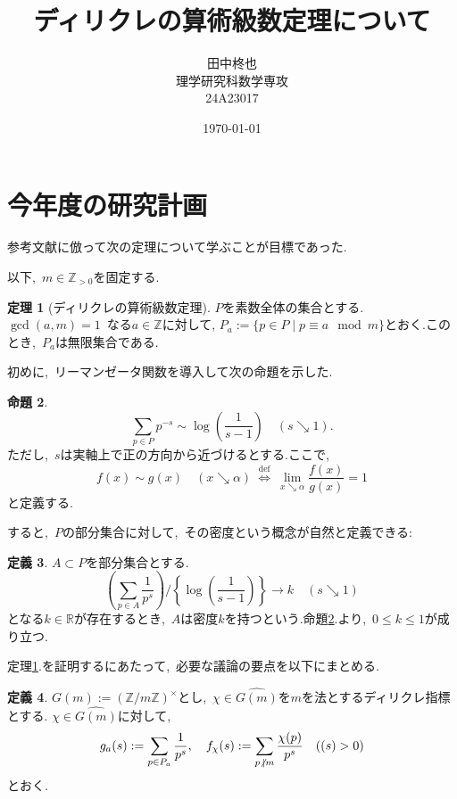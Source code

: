 \documentclass[uplatex,12pt]{jsarticle}
\title{ディリクレの算術級数定理について}
\author{田中柊也\\理学研究科数学専攻\\24A23017}
\date{\today}
\numberwithin{equation}{section}
\theoremstyle{definition}
\newtheorem{definition}{定義}[section]
\newtheorem{theorem}[definition]{定理}
\newtheorem{proposition}[definition]{命題}
\newcommand{\ndiv}{\not\hspace{2pt}\mid}
\let\Re\relax
\DeclareMathOperator{\Re}{Re}
\begin{document}
\section{今年度の研究計画}
参考文献\cite{arithmetic}に倣って次の定理について学ぶことが目標であった.

以下,\ $m\in\mathbb{Z}_{>0}$を固定する.


\begin{theorem}[ディリクレの算術級数定理] \label{thm:Dirichlet}
$P$を素数全体の集合とする.
$\gcd (a,m)=1$\ なる$a\in\mathbb{Z}$に対して, $P_a := \{p\in P \mid p\equiv a\mod m\}$とおく.このとき,\ $P_a$は無限集合である.
\end{theorem}

初めに,\ リーマンゼータ関数を導入して次の命題を示した.

\begin{proposition} \label{thm:zeta}
\begin{equation} 
	\sum_{p\in P}p^{-s}\sim \log\left(\frac{1}{s-1}\right) \quad (s\searrow 1).
\end{equation}
ただし,\ $s$は実軸上で正の方向から近づけるとする.ここで,
\begin{equation}
	f(x)\sim g(x)\quad(x\searrow\alpha)\ \overset{\text{def}}{\Longleftrightarrow}\ \lim_{x\searrow\alpha}\frac{f(x)}{g(x)}=1
\end{equation}
と定義する.
\end{proposition}


すると,\ $P$の部分集合に対して,\ その密度という概念が自然と定義できる:
\begin{definition}
$A\subset P$を部分集合とする.
\begin{equation}
	\left(\sum_{p\in A}\frac{1}{p^s}\right) \bigg/ \left\{\log\left(\frac{1}{s-1}\right)\right\}\rightarrow k \quad(s\searrow 1)
\end{equation}
となる$k\in\mathbb{R}$が存在するとき,\ $A$は密度$k$を持つという.命題\ref{thm:zeta}.より,\ $0\leq k\leq1$が成り立つ.
\end{definition}


定理\ref{thm:Dirichlet}.を証明するにあたって,\ 必要な議論の要点を以下にまとめる.


\begin{definition}
$G(m):=(\mathbb{Z}/m\mathbb{Z})^\times$とし,\ $\chi\in\widehat{G(m)}$を$m$を法とするディリクレ指標とする.
$\chi\in\widehat{G(m)}$に対して,
\begin{equation}
	g_a(s):=\sum_{p\in P_a}\frac{1}{p^s},\quad f_\chi(s):=\sum_{p\ndiv m}\frac{\chi(p)}{p^s} \quad(\Re(s)>0)
\end{equation}
とおく.
\end{definition}
\end{document}
